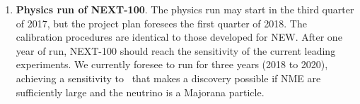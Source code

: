 \begin{enumerate}
\item {\bf Physics run of NEXT-100}. The physics run may start in the third quarter of 2017, but the project plan foresees the first quarter of 2018. The calibration procedures are identical to those developed for NEW. After one year of run, NEXT-100 should reach the sensitivity of the current leading experiments. We currently foresee to run for three years (2018 to 2020), achieving a sensitivity to \mbb\ that makes a discovery possible if NME are sufficiently large and the neutrino is a Majorana particle. 

\end{enumerate}
